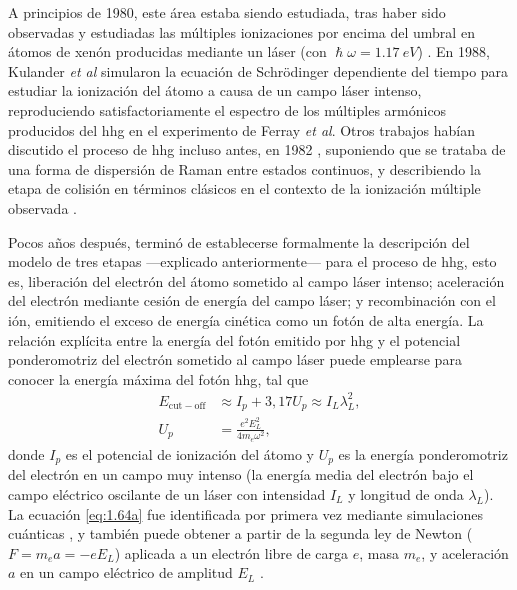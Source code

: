 A principios de 1980, este área estaba siendo estudiada, tras haber sido observadas y estudiadas las múltiples ionizaciones por encima del umbral en átomos de xenón producidas mediante un láser  (con $\hslash \omega = \qty{1.17}{eV}$) \autocite{Agostini1979}. En 1988, Kulander \emph{et al} \autocite{Kulander1989} simularon la ecuación de Schrödinger dependiente del tiempo para estudiar la ionización del átomo a causa de un campo láser intenso, reproduciendo satisfactoriamente el espectro de los múltiples armónicos producidos del \acrshort{hhg} en el experimento de Ferray \emph{et al}\autocite{Ferray1988}. Otros trabajos habían discutido el proceso de \acrshort{hhg} incluso antes, en 1982 \autocite{Shore1987,Gontier1982}, suponiendo que se trataba de una forma de dispersión de Raman entre estados continuos, y describiendo la etapa de colisión en términos clásicos en el contexto de la ionización múltiple observada \autocite{Kuchiev1987}.

Pocos años después, terminó de establecerse formalmente la descripción del modelo de tres etapas ---explicado anteriormente--- para el proceso de \acrshort{hhg}, esto es, liberación del electrón del átomo sometido al campo láser intenso; aceleración del electrón mediante cesión de energía del campo láser; y recombinación con el ión, emitiendo el exceso de energía cinética como un fotón de alta energía. La relación explícita entre la energía del fotón emitido por \acrshort{hhg} y el potencial ponderomotriz del electrón sometido al campo láser puede emplearse para conocer la energía máxima del fotón \acrshort{hhg}, tal que
\begin{align}
  \label{eq:1.64a}
  E_{\mathrm{cut-off}} &\approx I_{p} + 3,17U_{p} \approx I_{L} \lambda^{2}_{L}, \\
  \label{eq:1.64b}
  U_{p} &= \frac{e^{2}E^{2}_{L}}{4m_{e} \omega^{2}},
\end{align}
donde $I_{p}$ es el potencial de ionización del átomo y $U_{p}$ es la energía ponderomotriz del electrón en un campo muy intenso (la energía media del electrón bajo el campo eléctrico oscilante de un láser con intensidad $I_{L}$ y longitud de onda $\lambda_{L}$). La ecuación \eqref{eq:1.64a} fue identificada por primera vez mediante simulaciones cuánticas \autocite{Krause1992,Kulander1993}, y también puede obtener a partir de la segunda ley de Newton ($F = m_{e}a = -eE_{L}$) aplicada a un electrón libre de carga $e$, masa $m_{e}$, y aceleración $a$ en un campo eléctrico de amplitud $E_{L}$ \autocite{Corkum1993}.

